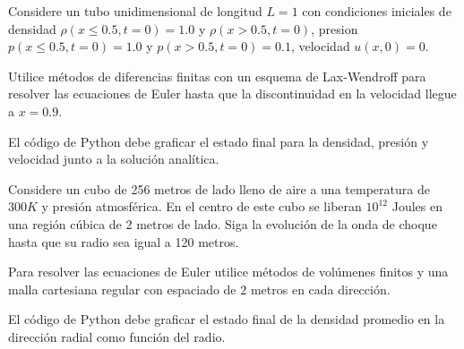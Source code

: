 \documentclass[11pt,letterpaper]{exam}
\begin{document}
\begin{questions}

Considere un tubo unidimensional de longitud $L=1$ con condiciones
iniciales de densidad $\rho(x\leq 0.5,t=0)=1.0$ y $\rho(x>0.5,t=0)$,
presion $p(x\leq0.5, t=0)=1.0$ y $p(x>0.5,t=0)=0.1$, velocidad
$u(x,0)=0$.

Utilice m\'etodos de diferencias finitas con un esquema de
Lax-Wendroff para resolver las ecuaciones de Euler hasta que la
discontinuidad en la velocidad llegue a $x=0.9$.

El c\'odigo de Python debe graficar el estado final para la densidad,
presi\'on y velocidad junto a la soluci\'on anal\'itica.
 

Considere un cubo de 256 metros de lado lleno de aire a una
temperatura de $300 K$ y presi\'on atmosf\'erica.
En el centro de este cubo se liberan $10^{12}$ Joules en una regi\'on
c\'ubica de 2 metros de lado. Siga la evoluci\'on de la onda de choque
hasta que su radio sea igual a 120 metros.

Para resolver las ecuaciones de Euler utilice m\'etodos de vol\'umenes
finitos y una malla cartesiana regular con espaciado de $2$ metros en
cada direcci\'on. 

El c\'odigo de Python debe graficar el estado final de la densidad
promedio en la direcci\'on radial como funci\'on del radio. 

\end{questions}
\end{document}
